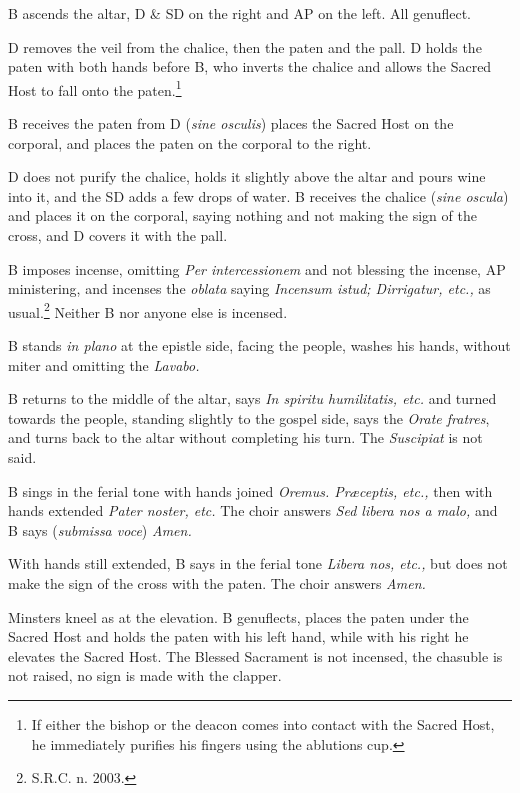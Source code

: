 {    \rubric B ascends the altar, D \& SD on the right and AP on the left. All
    genuflect.

    \rubric D removes the veil from the chalice, then the paten and the pall. D
    holds the paten with both hands before B, who inverts the chalice and
    allows the Sacred Host to fall onto the paten.\footnote{If either the
        bishop or the deacon comes into contact with the Sacred Host, he
        immediately purifies his fingers using the ablutions cup.}

    \rubric B receives the paten from D (\textit{sine osculis}) places the
    Sacred Host on the corporal, and places the paten on the corporal to the
    right.

    \rubric D does not purify the chalice, holds it slightly above the altar
    and pours wine into it, and the SD adds a few drops of water. B receives
    the chalice (\textit{sine oscula}) and places it on the corporal, saying
    nothing and not making the sign of the cross, and D covers it with the
    pall.

    \rubric B imposes incense, omitting \textit{Per intercessionem} and not
    blessing the incense, AP ministering, and incenses the \textit{oblata}
    saying \textit{Incensum istud; Dirrigatur, etc.,} as usual.\footnote{S.R.C.
    n. 2003.} Neither B nor anyone else is incensed.

    \rubric B stands \textit{in plano} at the epistle side, facing the people,
    washes his hands, without miter and omitting the \textit{Lavabo.}

    \rubric B returns to the middle of the altar, says \textit{In spiritu
    humilitatis, etc.} and turned towards the people, standing slightly to the
    gospel side, says the \textit{Orate fratres}, and turns back to the altar
    without completing his turn. The \textit{Suscipiat} is not said.

    \rubric B sings in the ferial tone with hands joined \textit{Oremus.
    Præceptis, etc.,} then with hands extended \textit{Pater noster, etc.} The
    choir answers \textit{Sed libera nos a malo,} and B says (\textit{submissa
    voce}) \textit{Amen.}

    \rubric With hands still extended, B says in the ferial tone \textit{Libera
    nos, etc.,} but does not make the sign of the cross with the paten. The
    choir answers \textit{Amen.}

    \rubric Minsters kneel as at the elevation. B genuflects, places the paten
    under the Sacred Host and holds the paten with his left hand, while with
    his right he elevates the Sacred Host. The Blessed Sacrament is not
    incensed, the chasuble is not raised, no sign is made with the clapper.

}
